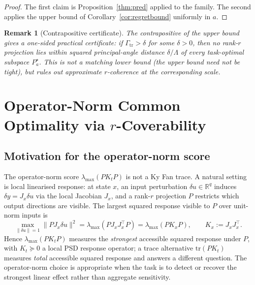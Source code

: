 \documentclass[final,3p,times]{elsarticle}
\newtheorem{remark}[theorem]{Remark}
\newcommand{\tr}{\mathrm{tr}}
\newcommand{\R}{\mathbb{R}}
\begin{document}
\begin{proof}
The first claim is Proposition~\ref{thm:pred} applied to the family.
The second applies the upper bound of Corollary~\ref{cor:regretbound}
uniformly in $a$.
\end{proof}

\begin{remark}[Contrapositive certificate]
The contrapositive of the upper bound gives a one-sided practical
certificate: if $\Gamma_{\mathrm{tr}}>\delta$ for some $\delta>0$, then
no rank-$r$ projection lies within squared principal-angle distance
$\delta/\Lambda$ of every task-optimal subspace $P_a^\star$.
This is not a matching lower bound (the upper bound need not be tight),
but rules out approximate $r$-coherence at the corresponding scale.
\end{remark}

\section{Operator-Norm Common Optimality via \texorpdfstring{$r$}{r}-Coverability}
\label{sec:caus}

\subsection{Motivation for the operator-norm score}

The operator-norm score $\lambda_{\max}(PK_tP)$ is not a Ky Fan trace.
A natural setting is local linearised response: at state $x$, an
input perturbation $\delta u\in\R^q$ induces $\delta y=J_x\delta u$ via
the local Jacobian $J_x$, and a rank-$r$ projection $P$ restricts which
output directions are visible.
The largest squared response visible to $P$ over unit-norm inputs is
\begin{equation}\label{eq:causmotiv}
\max_{\|\delta u\|=1}\|PJ_x\delta u\|^2
=\lambda_{\max}(PJ_xJ_x^\top P)
=\lambda_{\max}(PK_xP),\qquad K_x:=J_xJ_x^\top.
\end{equation}
Hence $\lambda_{\max}(PK_tP)$ measures the \emph{strongest} accessible
squared response under $P$, with $K_t\succeq 0$ a local PSD response
operator; a trace alternative $\tr(PK_t)$ measures \emph{total}
accessible squared response and answers a different question.
The operator-norm choice is appropriate when the task is to detect or
recover the strongest linear effect rather than aggregate sensitivity.
\end{document}
